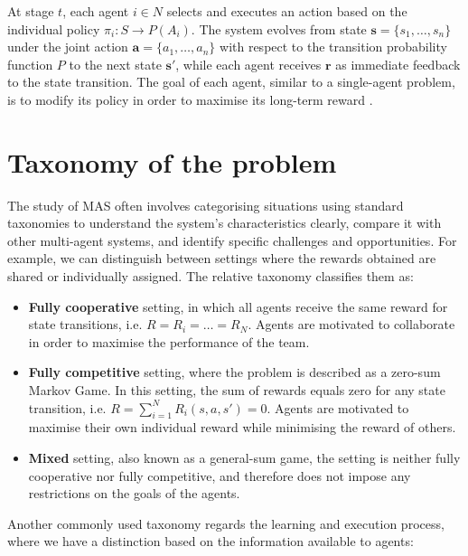 \documentclass[a4paper,singleside,12pt]{report} %
\begin{document}
At stage \(t\), each agent \(i \in N\) selects and executes an action based on the individual policy \(\pi_i: S \rightarrow P(A_i)\). The system evolves from state \(\textbf{s} = \{s_1, \dots, s_n\}\) under the joint action \(\textbf{a} = \{a_1, \dots, a_n\}\) with respect to the transition probability function \(P\) to the next state \(\textbf{s}'\), while each agent receives \(\textbf{r}\) as immediate feedback to the state transition. The goal of each agent, similar to a single-agent problem, is to modify its policy in order to maximise its long-term reward \cite{Rao2000ReinforcementLA}.

\section{Taxonomy of the problem}\label{taxonomy-of-the-problem}
The study of MAS often involves categorising situations using standard taxonomies to understand the system's characteristics clearly, compare it with other multi-agent systems, and identify specific challenges and opportunities. For example, we can distinguish between settings where the rewards obtained are shared or individually assigned. The relative taxonomy classifies them as:

\begin{itemize}
\item \textbf{Fully cooperative} setting, in which all agents receive the same reward for state transitions, i.e. $R = R_i = \dots = R_N$. Agents are motivated to collaborate in order to maximise the performance of the team.
\item \textbf{Fully competitive} setting, where the problem is described as a zero-sum Markov Game. In this setting, the sum of rewards equals zero for any state transition, i.e. $R = \sum_{i=1}^N R_i(s, a, s') = 0$. Agents are motivated to maximise their own individual reward while minimising the reward of others.
\item \textbf{Mixed} setting, also known as a general-sum game, the setting is neither fully cooperative nor fully competitive, and therefore does not impose any restrictions on the goals of the agents.
\end{itemize}

Another commonly used taxonomy regards the learning and execution process, where we have a distinction based on the information available to agents:
\end{document}
